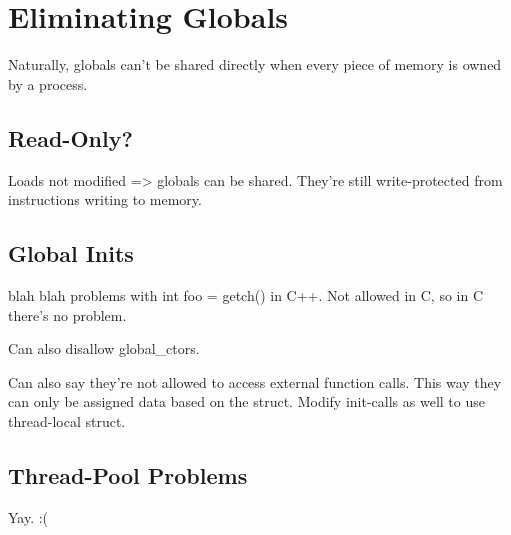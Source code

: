 \chapter {Eliminating Globals}

Naturally, globals can't be shared directly when every piece of memory is owned
by a process.

\section {Read-Only?}

Loads not modified => globals can be shared. They're still write-protected from
instructions writing to memory.

\section {Global Inits}

blah blah problems with int foo = getch() in C++. Not allowed in C, so in C
there's no problem.

Can also disallow global\_ctors.

Can also say they're not allowed to access external function calls. This way
they can only be assigned data based on the struct. Modify init-calls as well
to use thread-local struct.

\section {Thread-Pool Problems}

Yay. :(

